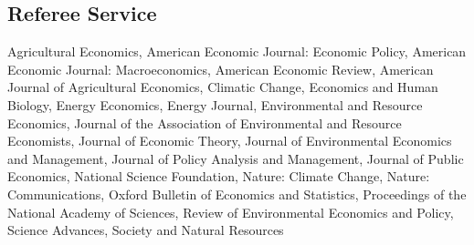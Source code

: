 \documentclass{res} %
\begin{document}
\begin{resume}
\vspace{-.075in}

\section{Referee Service}
	Agricultural Economics, American Economic Journal: Economic Policy, American Economic Journal: Macroeconomics, American Economic Review, American Journal of Agricultural Economics, Climatic Change, Economics and Human Biology, Energy Economics, Energy Journal, Environmental and Resource Economics, Journal of the Association of Environmental and Resource Economists, Journal of Economic Theory, Journal of Environmental Economics and Management, Journal of Policy Analysis and Management, Journal of Public Economics, National Science Foundation, Nature: Climate Change, Nature: Communications, Oxford Bulletin of Economics and Statistics, Proceedings of the National Academy of Sciences, Review of Environmental Economics and Policy, Science Advances, Society and Natural Resources

\vspace{-.075in}


\end{resume}
\end{document}
